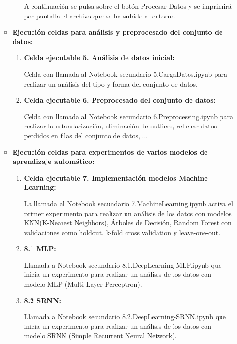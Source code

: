 \begin{enumerate}
\begin{itemize}
\begin{enumerate}
	
	A continuación se pulsa sobre el botón Procesar Datos y se imprimirá por pantalla el archivo que se ha subido al entorno
	
	\end{enumerate} 
	
   \item
   \textbf{Ejecución celdas para análisis y preprocesado del conjunto de datos: } 
	\begin{enumerate}
	\def\labelenumi{\arabic{enumi}.}
	\tightlist
	\item 
	\textbf{Celda ejecutable 5. Análisis de datos inicial: }
	
	Celda con llamada al Notebook secundario 5.CargaDatos.ipynb para realizar un análisis del tipo y forma del conjunto de datos.
	\item 
	\textbf{Celda ejecutable 6. Preprocesado del conjunto de datos:}
	
	Celda con llamada al Notebook secundario 6.Preprocessing.ipynb para realizar la estandarización, eliminación de outliers, rellenar datos perdidos en filas del conjunto de datos, ...
	\end{enumerate} 
	
   \item
   \textbf{Ejecución celdas para experimentos de varios modelos de aprendizaje automático: } 
	\begin{enumerate}
	\def\labelenumi{\arabic{enumi}.}
	\tightlist
	\item 
	\textbf{Celda ejecutable 7. Implementación modelos Machine Learning: }
	
	La llamada al Notebook secundario 7.MachineLearning.ipynb activa el primer experimento para realizar un análisis de los datos con modelos KNN(K-Nearest Neighbors), Árboles de Decisión, Random Forest con validaciones como holdout, k-fold cross validation y leave-one-out. 
	\item 
	\textbf{8.1 MLP:}
	
	Llamada a Notebook secundario 8.1.DeepLearning-MLP.ipynb que inicia un experimento para realizar un análisis de los datos con modelo MLP (Multi-Layer Perceptron).
	\item 
	\textbf{8.2 SRNN:}
	
	Llamada a Notebook secundario 8.2.DeepLearning-SRNN.ipynb que inicia un experimento para realizar un análisis de los datos con modelo SRNN (Simple Recurrent Neural Network).	
	

\end{enumerate}
\end{itemize}
\end{enumerate}
